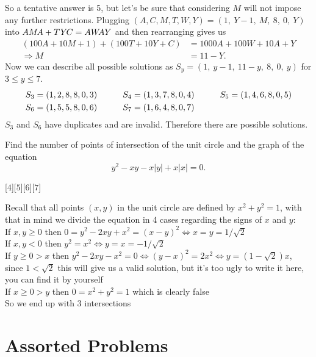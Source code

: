 \begin{solution}[A]
    So a tentative answer is 5, but let's be sure that considering $M$ will not impose any further restrictions. Plugging $(A,C,M,T,W,Y)=(1,\ Y-1,\ M,\ 8,\ 0,\ Y)$ into $A\mkern0mu M\mkern-2mu A+T\mkern1mu Y\mkern-2mu C=A\mkern0mu W\mkern-4mu A\mkern0mu Y$ and then rearranging gives us    
    \begin{align*}
            (100A + 10M + 1) + (100T + 10Y + C) &= 1000A + 100W + 10A + Y\\ 
            \Rightarrow M &= 11 - Y \text{.}
    \end{align*}
    Now we can describe all possible solutions as $S_y=(1,\ y-1,\ 11-y,\ 8,\ 0,\ y)$ for $3 \leq y \leq 7$.
    \[\begin{array}{l@{\hskip 30pt}l@{\hskip 30pt}l}
    S_3 = (1, 2, 8, 8, 0, 3) & S_4 = (1, 3, 7, 8, 0, 4) & S_5 = (1, 4, 6, 8, 0, 5) \\[1mm]
    S_6 = (1, 5, 5, 8, 0, 6) & S_7 = (1, 6, 4, 8, 0, 7)
    \end{array}\]
    $S_3$ and $S_6$ have duplicates and are invalid. Therefore there are  possible solutions.
\end{solution}

\begin{problem}
    Find the number of points of intersection of the unit circle and the graph of the equation\\
    $$y^2 - xy - x|y| + x|x| = 0.$$
\end{problem}

[$4$][$5$][$6$][$7$]

\begin{solution}[A]
    Recall that all points $(x,y)$ in the unit circle are defined by $x^2+y^2=1$, with that in mind we divide the equation in 4 cases regarding the signs of $x$ and $y$:\\
    If $x,y \geq 0$ then $0=y^2-2xy+x^2=(x-y)^2 \iff x=y=1/\sqrt2$\\
    If $x,y < 0$ then $y^2=x^2 \iff y=x=-1/ \sqrt2$\\
    If $y \geq 0 >x$ then $y^2-2xy-x^2=0 \iff (y-x)^2=2x^2 \iff y=(1-\sqrt2)x$, since $1<\sqrt2$ this will give us a valid solution, but it's too ugly to write it here, you can find it by yourself\\
    If $x \geq 0 > y$ then $0=x^2+y^2=1$ which is clearly false\\
    So we end up with $\boxed{3}$ intersections
\end{solution}

\section*{Assorted Problems}\vspace{-15pt}

